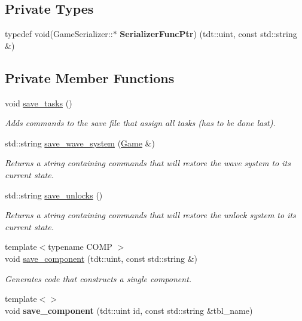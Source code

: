\subsection*{Private Types}
\begin{DoxyCompactItemize}
\item 
typedef void(Game\+Serializer\+::$\ast$ {\bfseries Serializer\+Func\+Ptr}) (tdt\+::uint, const std\+::string \&)\hypertarget{class_game_serializer_abd56146db26ebda55e7564b630d4abd9}{}\label{class_game_serializer_abd56146db26ebda55e7564b630d4abd9}

\end{DoxyCompactItemize}
\subsection*{Private Member Functions}
\begin{DoxyCompactItemize}
\item 
void \hyperlink{class_game_serializer_a828057a03cbf68491db761b34fc41658}{save\+\_\+tasks} ()
\begin{DoxyCompactList}\small\item\em Adds commands to the save file that assign all tasks (has to be done last). \end{DoxyCompactList}\item 
std\+::string \hyperlink{class_game_serializer_a2beb65f871b5635f5ae0c660615944e8}{save\+\_\+wave\+\_\+system} (\hyperlink{class_game}{Game} \&)
\begin{DoxyCompactList}\small\item\em Returns a string containing commands that will restore the wave system to it\textquotesingle{}s current state. \end{DoxyCompactList}\item 
std\+::string \hyperlink{class_game_serializer_ac200ccdf710ee88a2189b8775f0d2347}{save\+\_\+unlocks} ()
\begin{DoxyCompactList}\small\item\em Returns a string containing commands that will restore the unlock system to it\textquotesingle{}s current state. \end{DoxyCompactList}\item 
{\footnotesize template$<$typename C\+O\+MP $>$ }\\void \hyperlink{class_game_serializer_a56f3943e57b817f99f5787d15802ae81}{save\+\_\+component} (tdt\+::uint, const std\+::string \&)
\begin{DoxyCompactList}\small\item\em Generates code that constructs a single component. \end{DoxyCompactList}\item 
{\footnotesize template$<$$>$ }\\void {\bfseries save\+\_\+component} (tdt\+::uint id, const std\+::string \&tbl\+\_\+name)\hypertarget{class_game_serializer_a2b8f301421ab3d3df49c1b3537ab3b96}{}\label{class_game_serializer_a2b8f301421ab3d3df49c1b3537ab3b96}


\end{DoxyCompactItemize}
